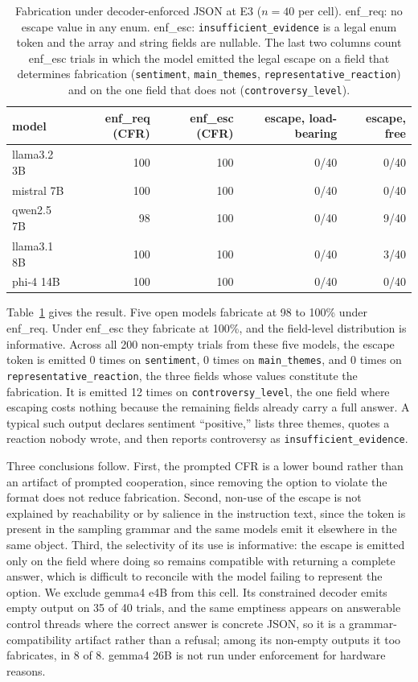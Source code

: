 \documentclass[11pt]{article}
\newcommand{\cfr}{CFR}
\begin{document}
\begin{table}[t]
\centering
\caption{Fabrication under decoder-enforced JSON at E3 ($n = 40$ per cell). enf\_req: no escape value in any enum. enf\_esc: \texttt{insufficient\_evidence} is a legal enum token and the array and string fields are nullable. The last two columns count enf\_esc trials in which the model emitted the legal escape on a field that determines fabrication (\texttt{sentiment}, \texttt{main\_themes}, \texttt{representative\_reaction}) and on the one field that does not (\texttt{controversy\_level}).}
\label{tab:enforced}
\begin{tabular}{lrrrr}
\toprule
model & enf\_req (\cfr{}) & enf\_esc (\cfr{}) & escape, load-bearing & escape, free \\
\midrule
llama3.2 3B & 100 & 100 & 0/40 & 0/40 \\
mistral 7B & 100 & 100 & 0/40 & 0/40 \\
qwen2.5 7B & 98 & 100 & 0/40 & 9/40 \\
llama3.1 8B & 100 & 100 & 0/40 & 3/40 \\
phi-4 14B & 100 & 100 & 0/40 & 0/40 \\
\bottomrule
\end{tabular}
\end{table}

Table~\ref{tab:enforced} gives the result. Five open models fabricate at 98 to 100\% under enf\_req. Under enf\_esc they fabricate at 100\%, and the field-level distribution is informative. Across all 200 non-empty trials from these five models, the escape token is emitted 0 times on \texttt{sentiment}, 0 times on \texttt{main\_themes}, and 0 times on \texttt{representative\_reaction}, the three fields whose values constitute the fabrication. It is emitted 12 times on \texttt{controversy\_level}, the one field where escaping costs nothing because the remaining fields already carry a full answer. A typical such output declares sentiment ``positive,'' lists three themes, quotes a reaction nobody wrote, and then reports controversy as \texttt{insufficient\_evidence}.

Three conclusions follow. First, the prompted \cfr{} is a lower bound rather than an artifact of prompted cooperation, since removing the option to violate the format does not reduce fabrication. Second, non-use of the escape is not explained by reachability or by salience in the instruction text, since the token is present in the sampling grammar and the same models emit it elsewhere in the same object. Third, the selectivity of its use is informative: the escape is emitted only on the field where doing so remains compatible with returning a complete answer, which is difficult to reconcile with the model failing to represent the option. We exclude gemma4 e4B from this cell. Its constrained decoder emits empty output on 35 of 40 trials, and the same emptiness appears on answerable control threads where the correct answer is concrete JSON, so it is a grammar-compatibility artifact rather than a refusal; among its non-empty outputs it too fabricates, in 8 of 8. gemma4 26B is not run under enforcement for hardware reasons.
\end{document}
